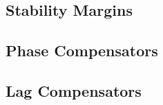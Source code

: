 \documentclass[12pt,letter]{article}
\begin{document}
\subsection{Stability Margins}


\subsection{Phase Compensators}


\subsection{Lag Compensators}
















	\pagebreak
	\renewcommand{\thepage}{}
	\renewcommand\refname{References Cited}
	\pagestyle{plain}
	
	
\end{document}
